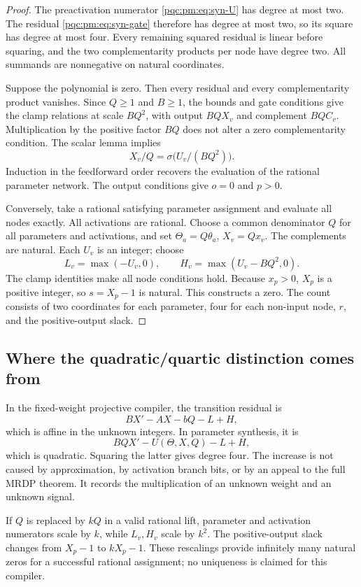 \documentclass[11pt,letterpaper]{article}
\numberwithin{equation}{section}
\theoremstyle{definition}
\theoremstyle{remark}
\begin{document}
\begin{proof}
The preactivation numerator \eqref{pqc:pm:eq:syn-U} has degree at most two.
The residual \eqref{pqc:pm:eq:syn-gate} therefore has degree at most two, so its
square has degree at most four. Every remaining squared residual is linear
before squaring, and the two complementarity products per node have degree
two. All summands are nonnegative on natural coordinates.

Suppose the polynomial is zero. Then every residual and every
complementarity product vanishes. Since $Q\geq1$ and $B\geq1$, the bounds
and gate conditions give the clamp relations at scale $BQ^2$, with output
$BQX_v$ and complement $BQC_v$. Multiplication by the positive factor $BQ$
does not alter a zero complementarity condition. The scalar lemma implies
\[
 X_v/Q=\sigma\bigl(U_v/(BQ^2)\bigr).
\]
Induction in the feedforward order recovers the evaluation of the rational
parameter network. The output conditions give $o=0$ and $p>0$.

Conversely, take a rational satisfying parameter assignment and evaluate
all nodes exactly. All activations are rational. Choose a common denominator
$Q$ for all parameters and activations, and set $\Theta_a=Q\theta_a$,
$X_v=Qx_v$. The complements are natural. Each $U_v$ is an integer; choose
\[
 L_v=\max(-U_v,0),\qquad H_v=\max(U_v-BQ^2,0).
\]
The clamp identities make all node conditions hold. Because $x_p>0$,
$X_p$ is a positive integer, so $s=X_p-1$ is natural. This constructs a zero.
The count consists of two coordinates for each parameter, four for each
non-input node, $r$, and the positive-output slack.
\end{proof}

\subsection{Where the quadratic/quartic distinction comes from}

In the fixed-weight projective compiler, the transition residual is
\[
 BX'-AX-bQ-L+H,
\]
which is affine in the unknown integers. In parameter synthesis, it is
\[
 BQX'-U(\Theta,X,Q)-L+H,
\]
which is quadratic. Squaring the latter gives degree four. The increase is
not caused by approximation, by activation branch bits, or by an appeal to
the full MRDP theorem. It records the multiplication of an unknown weight
and an unknown signal.

If $Q$ is replaced by $kQ$ in a valid rational lift, parameter and activation
numerators scale by $k$, while $L_v,H_v$ scale by $k^2$. The positive-output
slack changes from $X_p-1$ to $kX_p-1$. These rescalings provide infinitely
many natural zeros for a successful rational assignment; no uniqueness is
claimed for this compiler.
\end{document}
